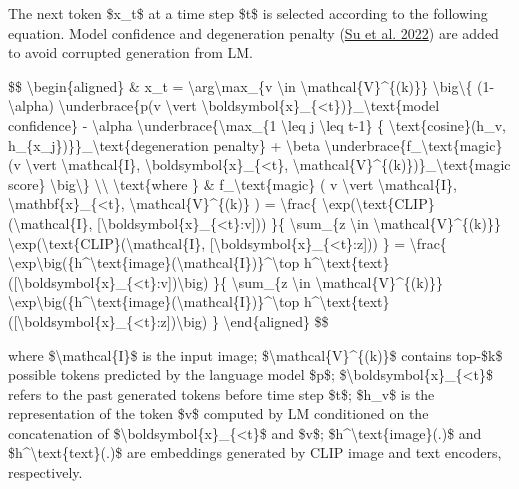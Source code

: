 The next token \$x\_t\$ at a time step \$t\$ is selected according to the following equation. Model confidence and degeneration penalty (\href{https://arxiv.org/abs/2202.06417}{Su et al. 2022}) are added to avoid corrupted generation from LM.

\$\$ \textbackslash begin\{aligned\} \& x\_t = \textbackslash arg\textbackslash max\_\{v \textbackslash in \textbackslash mathcal\{V\}\^{}\{(k)\}\} \textbackslash big\textbackslash\{ (1-\textbackslash alpha) \textbackslash underbrace\{p(v \textbackslash vert \textbackslash boldsymbol\{x\}\_\{\textless t\})\}\_\textbackslash text\{model confidence\} - \textbackslash alpha \textbackslash underbrace\{\textbackslash max\_\{1 \textbackslash leq j \textbackslash leq t-1\} \{ \textbackslash text\{cosine\}(h\_v, h\_\{x\_j\})\}\}\_\textbackslash text\{degeneration penalty\} + \textbackslash beta \textbackslash underbrace\{f\_\textbackslash text\{magic\}(v \textbackslash vert \textbackslash mathcal\{I\}, \textbackslash boldsymbol\{x\}\_\{\textless t\}, \textbackslash mathcal\{V\}\^{}\{(k)\})\}\_\textbackslash text\{magic score\} \textbackslash big\textbackslash\} \textbackslash\textbackslash{} \textbackslash text\{where \} \& f\_\textbackslash text\{magic\} ( v \textbackslash vert \textbackslash mathcal\{I\}, \textbackslash mathbf\{x\}\_\{\textless t\}, \textbackslash mathcal\{V\}\^{}\{(k)\} ) = \textbackslash frac\{ \textbackslash exp(\textbackslash text\{CLIP\}(\textbackslash mathcal\{I\}, {[}\textbackslash boldsymbol\{x\}\_\{\textless t\}:v{]})) \}\{ \textbackslash sum\_\{z \textbackslash in \textbackslash mathcal\{V\}\^{}\{(k)\}\} \textbackslash exp(\textbackslash text\{CLIP\}(\textbackslash mathcal\{I\}, {[}\textbackslash boldsymbol\{x\}\_\{\textless t\}:z{]})) \} = \textbackslash frac\{ \textbackslash exp\textbackslash big(\{h\^{}\textbackslash text\{image\}(\textbackslash mathcal\{I\})\}\^{}\textbackslash top h\^{}\textbackslash text\{text\}({[}\textbackslash boldsymbol\{x\}\_\{\textless t\}:v{]})\textbackslash big) \}\{ \textbackslash sum\_\{z \textbackslash in \textbackslash mathcal\{V\}\^{}\{(k)\}\} \textbackslash exp\textbackslash big(\{h\^{}\textbackslash text\{image\}(\textbackslash mathcal\{I\})\}\^{}\textbackslash top h\^{}\textbackslash text\{text\}({[}\textbackslash boldsymbol\{x\}\_\{\textless t\}:z{]})\textbackslash big) \} \textbackslash end\{aligned\} \$\$

where \$\textbackslash mathcal\{I\}\$ is the input image; \$\textbackslash mathcal\{V\}\^{}\{(k)\}\$ contains top-\$k\$ possible tokens predicted by the language model \$p\$; \$\textbackslash boldsymbol\{x\}\_\{\textless t\}\$ refers to the past generated tokens before time step \$t\$; \$h\_v\$ is the representation of the token \$v\$ computed by LM conditioned on the concatenation of \$\textbackslash boldsymbol\{x\}\_\{\textless t\}\$ and \$v\$; \$h\^{}\textbackslash text\{image\}(.)\$ and \$h\^{}\textbackslash text\{text\}(.)\$ are embeddings generated by CLIP image and text encoders, respectively.

